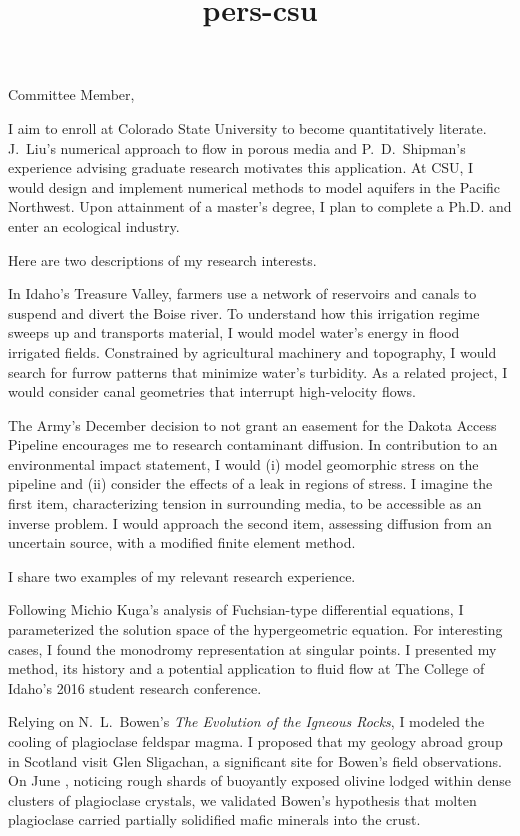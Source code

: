 \documentclass[10pt]{letter}
\date{}
\title{pers-csu}
\newcommand{\topic}[1]{\textmd{#1}}
\begin{document}
\begin{letter}{
}
\opening{Committee Member,}
I aim to enroll at Colorado State University to become quantitatively literate. J.~Liu's numerical approach to flow in porous media and P.~D.~Shipman's experience advising graduate research motivates this application. At CSU, I would design and implement numerical methods to model aquifers in the Pacific Northwest. Upon attainment of a master's degree, I plan to complete a Ph.D. and enter an ecological industry.

Here are two descriptions of my research interests. 
\begin{description}[topsep=0pt]
	\item[Sediment Transport]
		In Idaho's Treasure Valley, farmers use a network of reservoirs and canals to suspend and divert the Boise river. To understand how this irrigation regime sweeps up and transports material, I would model water's energy in flood irrigated fields. Constrained by agricultural machinery and topography, I would search for furrow patterns that minimize water's turbidity. As a related project, I would consider canal geometries that interrupt high-velocity flows.
	\item[Ground Water Contamination]
		The Army's December decision to not grant an easement for the Dakota Access Pipeline encourages me to research contaminant diffusion. In contribution to an environmental impact statement, I would (i) model geomorphic stress on the pipeline and (ii) consider the effects of a leak in regions of stress. I imagine the first item, characterizing tension in surrounding media, to be accessible as an inverse problem. I would approach the second item, assessing diffusion from an uncertain source, with a modified finite element method.
\end{description}

I share two examples of my relevant research experience. 
\begin{description}[topsep=0pt]
    \item[Galois Theory \& Fuchsian Equations] 
    	Following Michio Kuga's analysis of Fuchsian-type differential equations, I parameterized the solution space of the hypergeometric equation. For interesting cases, I found the monodromy representation at singular points. I presented my method, its history and a potential application to \topic{fluid flow} at The College of Idaho's 2016 student research conference.
    \item[Igneous Dikes in Scotland]
        Relying on N.~L.~Bowen's \emph{The Evolution of the Igneous Rocks}, I modeled the cooling of plagioclase feldspar magma. I proposed that my geology abroad group in Scotland visit Glen Sligachan, a significant site for Bowen's field observations. On June , noticing rough shards of buoyantly exposed olivine lodged within dense clusters of plagioclase crystals, we validated Bowen's hypothesis that molten plagioclase carried partially solidified mafic minerals into the crust. 
\end{description}


\end{letter}
\end{document}
